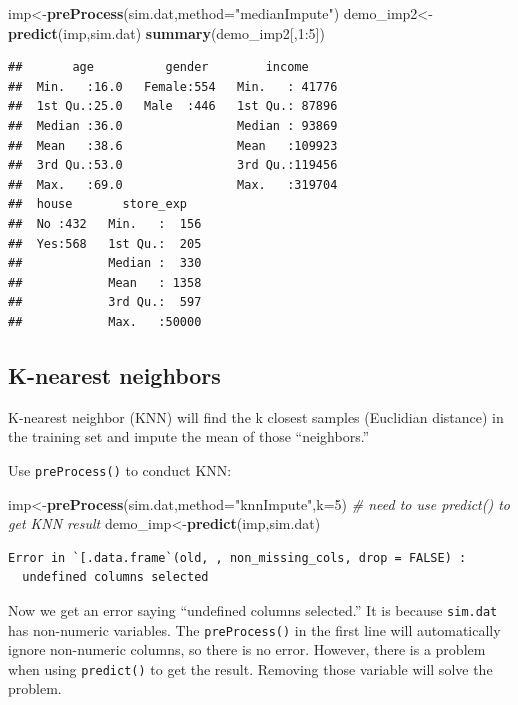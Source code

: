 \documentclass[12pt,]{krantz}
\newenvironment{Shaded}{\begin{snugshade}}{\end{snugshade}}
\newcommand{\KeywordTok}[1]{\textcolor[rgb]{0.13,0.29,0.53}{\textbf{{#1}}}}
\newcommand{\DataTypeTok}[1]{\textcolor[rgb]{0.13,0.29,0.53}{{#1}}}
\newcommand{\DecValTok}[1]{\textcolor[rgb]{0.00,0.00,0.81}{{#1}}}
\newcommand{\StringTok}[1]{\textcolor[rgb]{0.31,0.60,0.02}{{#1}}}
\newcommand{\CommentTok}[1]{\textcolor[rgb]{0.56,0.35,0.01}{\textit{{#1}}}}
\newcommand{\NormalTok}[1]{{#1}}
\theoremstyle{definition}
\theoremstyle{definition}
\theoremstyle{remark}
\begin{document}
\begin{Shaded}
\begin{Highlighting}[]
\NormalTok{imp<-}\KeywordTok{preProcess}\NormalTok{(sim.dat,}\DataTypeTok{method=}\StringTok{"medianImpute"}\NormalTok{)}
\NormalTok{demo_imp2<-}\KeywordTok{predict}\NormalTok{(imp,sim.dat)}
\KeywordTok{summary}\NormalTok{(demo_imp2[,}\DecValTok{1}\NormalTok{:}\DecValTok{5}\NormalTok{])}
\end{Highlighting}
\end{Shaded}

\begin{verbatim}
##       age          gender        income      
##  Min.   :16.0   Female:554   Min.   : 41776  
##  1st Qu.:25.0   Male  :446   1st Qu.: 87896  
##  Median :36.0                Median : 93869  
##  Mean   :38.6                Mean   :109923  
##  3rd Qu.:53.0                3rd Qu.:119456  
##  Max.   :69.0                Max.   :319704  
##  house       store_exp    
##  No :432   Min.   :  156  
##  Yes:568   1st Qu.:  205  
##            Median :  330  
##            Mean   : 1358  
##            3rd Qu.:  597  
##            Max.   :50000
\end{verbatim}

\subsection{K-nearest neighbors}\label{k-nearest-neighbors}

K-nearest neighbor (KNN) will find the k closest samples (Euclidian
distance) in the training set and impute the mean of those
``neighbors.''

Use \texttt{preProcess()} to conduct KNN:

\begin{Shaded}
\begin{Highlighting}[]
\NormalTok{imp<-}\KeywordTok{preProcess}\NormalTok{(sim.dat,}\DataTypeTok{method=}\StringTok{"knnImpute"}\NormalTok{,}\DataTypeTok{k=}\DecValTok{5}\NormalTok{)}
\CommentTok{# need to use predict() to get KNN result}
\NormalTok{demo_imp<-}\KeywordTok{predict}\NormalTok{(imp,sim.dat)}
\end{Highlighting}
\end{Shaded}

\begin{verbatim}
Error in `[.data.frame`(old, , non_missing_cols, drop = FALSE) : 
  undefined columns selected
\end{verbatim}

Now we get an error saying ``undefined columns selected.'' It is because
\texttt{sim.dat} has non-numeric variables. The \texttt{preProcess()} in
the first line will automatically ignore non-numeric columns, so there
is no error. However, there is a problem when using \texttt{predict()}
to get the result. Removing those variable will solve the problem.
\end{document}
